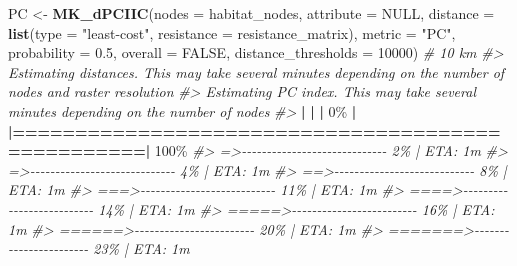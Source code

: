 \documentclass[
]{book}
\newenvironment{Shaded}{\begin{snugshade}}{\end{snugshade}}
\newcommand{\AttributeTok}[1]{\textcolor[rgb]{0.13,0.29,0.53}{#1}}
\newcommand{\CommentTok}[1]{\textcolor[rgb]{0.56,0.35,0.01}{\textit{#1}}}
\newcommand{\ConstantTok}[1]{\textcolor[rgb]{0.56,0.35,0.01}{#1}}
\newcommand{\DecValTok}[1]{\textcolor[rgb]{0.00,0.00,0.81}{#1}}
\newcommand{\ErrorTok}[1]{\textcolor[rgb]{0.64,0.00,0.00}{\textbf{#1}}}
\newcommand{\FloatTok}[1]{\textcolor[rgb]{0.00,0.00,0.81}{#1}}
\newcommand{\FunctionTok}[1]{\textcolor[rgb]{0.13,0.29,0.53}{\textbf{#1}}}
\newcommand{\NormalTok}[1]{#1}
\newcommand{\OtherTok}[1]{\textcolor[rgb]{0.56,0.35,0.01}{#1}}
\newcommand{\SpecialCharTok}[1]{\textcolor[rgb]{0.81,0.36,0.00}{\textbf{#1}}}
\newcommand{\StringTok}[1]{\textcolor[rgb]{0.31,0.60,0.02}{#1}}
\begin{document}
\begin{Shaded}
\begin{Highlighting}[]
\NormalTok{PC }\OtherTok{\textless{}{-}} \FunctionTok{MK\_dPCIIC}\NormalTok{(}\AttributeTok{nodes =}\NormalTok{ habitat\_nodes,}
                \AttributeTok{attribute =} \ConstantTok{NULL}\NormalTok{,}
                \AttributeTok{distance =} \FunctionTok{list}\NormalTok{(}\AttributeTok{type =} \StringTok{"least{-}cost"}\NormalTok{,}
                                \AttributeTok{resistance =}\NormalTok{ resistance\_matrix),}
                \AttributeTok{metric =} \StringTok{"PC"}\NormalTok{, }\AttributeTok{probability =} \FloatTok{0.5}\NormalTok{,}
                \AttributeTok{overall =} \ConstantTok{FALSE}\NormalTok{,}
                \AttributeTok{distance\_thresholds =} \DecValTok{10000}\NormalTok{) }\CommentTok{\# 10 km}
\CommentTok{\#\textgreater{} Estimating distances. This may take several minutes depending on the number of nodes and raster resolution}
\CommentTok{\#\textgreater{} Estimating PC index. This may take several minutes depending on the number of nodes}
\CommentTok{\#\textgreater{} }
  \SpecialCharTok{|}                                                        
  \ErrorTok{|}                                                  \ErrorTok{|}   \DecValTok{0}\NormalTok{\%}
  \SpecialCharTok{|}                                                        
  \ErrorTok{|==================================================|} \DecValTok{100}\NormalTok{\%}
\CommentTok{\#\textgreater{}  =\textgreater{}{-}{-}{-}{-}{-}{-}{-}{-}{-}{-}{-}{-}{-}{-}{-}{-}{-}{-}{-}{-}{-}{-}{-}{-}{-}{-}{-}{-}{-}    2\% |  ETA:  1m}
\CommentTok{\#\textgreater{}  =\textgreater{}{-}{-}{-}{-}{-}{-}{-}{-}{-}{-}{-}{-}{-}{-}{-}{-}{-}{-}{-}{-}{-}{-}{-}{-}{-}{-}{-}{-}{-}    4\% |  ETA:  1m}
\CommentTok{\#\textgreater{}  ==\textgreater{}{-}{-}{-}{-}{-}{-}{-}{-}{-}{-}{-}{-}{-}{-}{-}{-}{-}{-}{-}{-}{-}{-}{-}{-}{-}{-}{-}{-}    8\% |  ETA:  1m}
\CommentTok{\#\textgreater{}  ===\textgreater{}{-}{-}{-}{-}{-}{-}{-}{-}{-}{-}{-}{-}{-}{-}{-}{-}{-}{-}{-}{-}{-}{-}{-}{-}{-}{-}{-}   11\% |  ETA:  1m}
\CommentTok{\#\textgreater{}  ====\textgreater{}{-}{-}{-}{-}{-}{-}{-}{-}{-}{-}{-}{-}{-}{-}{-}{-}{-}{-}{-}{-}{-}{-}{-}{-}{-}{-}   14\% |  ETA:  1m}
\CommentTok{\#\textgreater{}  =====\textgreater{}{-}{-}{-}{-}{-}{-}{-}{-}{-}{-}{-}{-}{-}{-}{-}{-}{-}{-}{-}{-}{-}{-}{-}{-}{-}   16\% |  ETA:  1m}
\CommentTok{\#\textgreater{}  ======\textgreater{}{-}{-}{-}{-}{-}{-}{-}{-}{-}{-}{-}{-}{-}{-}{-}{-}{-}{-}{-}{-}{-}{-}{-}{-}   20\% |  ETA:  1m}
\CommentTok{\#\textgreater{}  =======\textgreater{}{-}{-}{-}{-}{-}{-}{-}{-}{-}{-}{-}{-}{-}{-}{-}{-}{-}{-}{-}{-}{-}{-}{-}   23\% |  ETA:  1m}

\end{Highlighting}
\end{Shaded}
\end{document}
